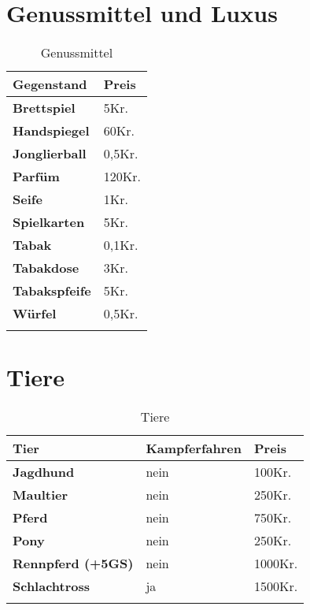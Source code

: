 \section{Genussmittel und Luxus}
\begin{longtable}{|p{5cm}|p{2cm}|}
\hline
\textbf{Gegenstand} & \textbf{Preis} \\ \hline
\textbf{Brettspiel} & 5Kr. \\ \hline
\textbf{Handspiegel} & 60Kr. \\ \hline
\textbf{Jonglierball} & 0,5Kr. \\ \hline
\textbf{Parfüm} & 120Kr. \\ \hline
\textbf{Seife} & 1Kr. \\ \hline
\textbf{Spielkarten} & 5Kr. \\ \hline
\textbf{Tabak} & 0,1Kr. \\ \hline
\textbf{Tabakdose} & 3Kr. \\ \hline
\textbf{Tabakspfeife} & 5Kr. \\ \hline
\textbf{Würfel} & 0,5Kr. \\ \hline

\caption{Genussmittel}
\label{tab:Genussmittel}
\end{longtable}


\section{Tiere}
\begin{longtable}{|p{5cm}|p{4cm}|p{2cm}|}
\hline
\textbf{Tier} & \textbf{Kampferfahren} & \textbf{Preis} \\ \hline
\textbf{Jagdhund} & nein & 100Kr. \\ \hline
\textbf{Maultier} & nein & 250Kr. \\ \hline
\textbf{Pferd} & nein & 750Kr. \\ \hline
\textbf{Pony} & nein & 250Kr. \\ \hline
\textbf{Rennpferd (+5GS)} & nein & 1000Kr. \\ \hline
\textbf{Schlachtross} & ja & 1500Kr. \\ \hline

\caption{Tiere}
\label{tab:Tiere}
\end{longtable}

\newpage

